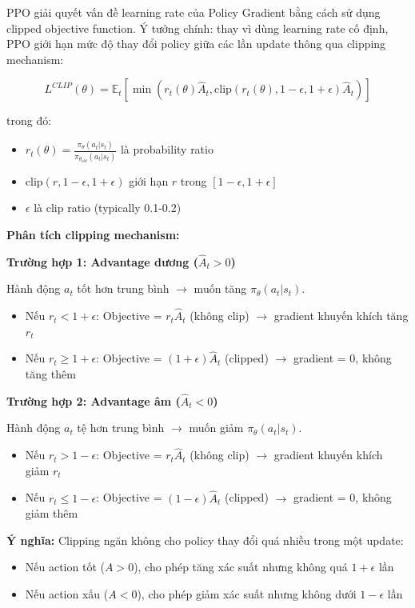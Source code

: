 PPO giải quyết vấn đề learning rate của Policy Gradient bằng cách sử dụng clipped objective function. Ý tưởng chính: thay vì dùng learning rate cố định, PPO giới hạn mức độ thay đổi policy giữa các lần update thông qua clipping mechanism:

\begin{equation}
L^{CLIP}(\theta) = \mathbb{E}_t \left[ \min \left( r_t(\theta) \hat{A}_t, \text{clip}(r_t(\theta), 1-\epsilon, 1+\epsilon) \hat{A}_t \right) \right]
\end{equation}

trong đó:
\begin{itemize}
\item $r_t(\theta) = \frac{\pi_\theta(a_t|s_t)}{\pi_{\theta_{old}}(a_t|s_t)}$ là probability ratio
\item $\text{clip}(r, 1-\epsilon, 1+\epsilon)$ giới hạn $r$ trong $[1-\epsilon, 1+\epsilon]$
\item $\epsilon$ là clip ratio (typically 0.1-0.2)
\end{itemize}

\textbf{Phân tích clipping mechanism:}

\textbf{Trường hợp 1: Advantage dương ($\hat{A}_t > 0$)}

Hành động $a_t$ tốt hơn trung bình $\rightarrow$ muốn tăng $\pi_\theta(a_t|s_t)$.
\begin{itemize}
\item Nếu $r_t < 1 + \epsilon$: Objective = $r_t \hat{A}_t$ (không clip) $\rightarrow$ gradient khuyến khích tăng $r_t$
\item Nếu $r_t \geq 1 + \epsilon$: Objective = $(1+\epsilon) \hat{A}_t$ (clipped) $\rightarrow$ gradient = 0, không tăng thêm
\end{itemize}

\textbf{Trường hợp 2: Advantage âm ($\hat{A}_t < 0$)}

Hành động $a_t$ tệ hơn trung bình $\rightarrow$ muốn giảm $\pi_\theta(a_t|s_t)$.
\begin{itemize}
\item Nếu $r_t > 1 - \epsilon$: Objective = $r_t \hat{A}_t$ (không clip) $\rightarrow$ gradient khuyến khích giảm $r_t$
\item Nếu $r_t \leq 1 - \epsilon$: Objective = $(1-\epsilon) \hat{A}_t$ (clipped) $\rightarrow$ gradient = 0, không giảm thêm
\end{itemize}

\textbf{Ý nghĩa:} Clipping ngăn không cho policy thay đổi quá nhiều trong một update:
\begin{itemize}
\item Nếu action tốt ($A > 0$), cho phép tăng xác suất nhưng không quá $1+\epsilon$ lần
\item Nếu action xấu ($A < 0$), cho phép giảm xác suất nhưng không dưới $1-\epsilon$ lần
\end{itemize}

